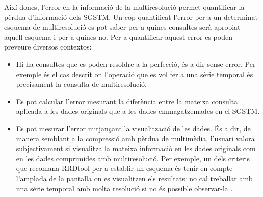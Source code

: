 Així doncs, l'error en la informació de la multiresolució permet
quantificar la pèrdua d'informació dels \gls{SGSTM}. Un cop
quantificat l'error per a un determinat esquema de multiresolució es
pot saber per a quines consultes serà apropiat aquell esquema i per a
quines no. Per a quantificar aquest error es poden preveure diversos
contextos:
\begin{itemize}
\item Hi ha consultes que es poden resoldre a la perfecció, és a dir
  sense error. Per exemple és el cas descrit on l'operació que es vol
  fer a una sèrie temporal és precisament la consulta de
  multiresolució.

\item Es pot calcular l'error mesurant la diferència entre la mateixa
  consulta aplicada a les dades originals que a les dades
  emmagatzemades en el \gls{SGSTM}.

\item Es pot mesurar l'error mitjançant la visualització de les
  dades. És a dir, de manera semblant a la compressió amb pèrdua de
  multimèdia, l'usuari valora subjectivament si visualitza la mateixa
  informació en les dades originals com en les dades comprimides amb
  multiresolució. Per exemple, un dels criteris que recomana RRDtool
  per a establir un esquema és tenir en compte l'amplada de la
  pantalla on es visualitzen els resultats: no cal treballar amb una
  sèrie temporal amb molta resolució si no és possible observar-la
  .

\end{itemize}













